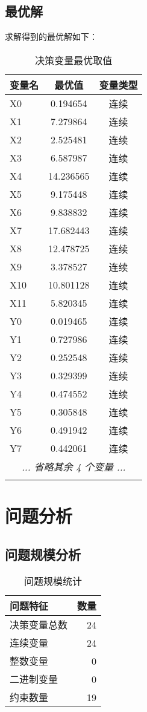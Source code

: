 \documentclass[12pt,a4paper]{article}
\begin{document}
\subsection{最优解}

求解得到的最优解如下：

\begin{longtable}{lcc}
\toprule
\textbf{变量名} & \textbf{最优值} & \textbf{变量类型} \\
\midrule
X0 & 0.194654 & 连续 \\
X1 & 7.279864 & 连续 \\
X2 & 2.525481 & 连续 \\
X3 & 6.587987 & 连续 \\
X4 & 14.236565 & 连续 \\
X5 & 9.175448 & 连续 \\
X6 & 9.838832 & 连续 \\
X7 & 17.682443 & 连续 \\
X8 & 12.478725 & 连续 \\
X9 & 3.378527 & 连续 \\
X10 & 10.801128 & 连续 \\
X11 & 5.820345 & 连续 \\
Y0 & 0.019465 & 连续 \\
Y1 & 0.727986 & 连续 \\
Y2 & 0.252548 & 连续 \\
Y3 & 0.329399 & 连续 \\
Y4 & 0.474552 & 连续 \\
Y5 & 0.305848 & 连续 \\
Y6 & 0.491942 & 连续 \\
Y7 & 0.442061 & 连续 \\
\midrule
\multicolumn{3}{c}{\textit{... 省略其余 4 个变量 ...}} \\

\bottomrule
\caption{决策变量最优取值}
\end{longtable}

\section{问题分析}

\subsection{问题规模分析}

\begin{table}[h]
\centering
\begin{tabular}{lr}
\toprule
\textbf{问题特征} & \textbf{数量} \\
\midrule
决策变量总数 & 24 \\
连续变量 & 24 \\
整数变量 & 0 \\
二进制变量 & 0 \\
约束数量 & 19 \\
\bottomrule
\end{tabular}
\caption{问题规模统计}
\end{table}
\end{document}
